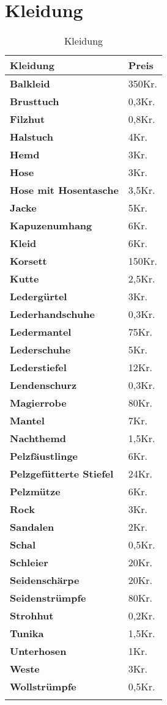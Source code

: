 \section{Kleidung}
\begin{longtable}{|p{5cm}|p{2cm}|}
\hline
\textbf{Kleidung} & \textbf{Preis} \\ \hline
\textbf{Balkleid} & 350Kr. \\ \hline
\textbf{Brusttuch} & 0,3Kr. \\ \hline
\textbf{Filzhut} & 0,8Kr. \\ \hline
\textbf{Halstuch} & 4Kr. \\ \hline
\textbf{Hemd} & 3Kr. \\ \hline
\textbf{Hose} & 3Kr. \\ \hline
\textbf{Hose mit Hosentasche} & 3,5Kr. \\ \hline
\textbf{Jacke} & 5Kr. \\ \hline
\textbf{Kapuzenumhang} & 6Kr. \\ \hline
\textbf{Kleid} & 6Kr. \\ \hline
\textbf{Korsett} & 150Kr. \\ \hline
\textbf{Kutte} & 2,5Kr. \\ \hline
\textbf{Ledergürtel} & 3Kr. \\ \hline
\textbf{Lederhandschuhe} & 0,3Kr. \\ \hline
\textbf{Ledermantel} & 75Kr. \\ \hline
\textbf{Lederschuhe} & 5Kr. \\ \hline
\textbf{Lederstiefel} & 12Kr. \\ \hline
\textbf{Lendenschurz} & 0,3Kr. \\ \hline
\textbf{Magierrobe} & 80Kr. \\ \hline
\textbf{Mantel} & 7Kr. \\ \hline
\textbf{Nachthemd} & 1,5Kr. \\ \hline
\textbf{Pelzfäustlinge} & 6Kr. \\ \hline
\textbf{Pelzgefütterte Stiefel} & 24Kr. \\ \hline
\textbf{Pelzmütze} & 6Kr. \\ \hline
\textbf{Rock} & 3Kr. \\ \hline
\textbf{Sandalen} & 2Kr. \\ \hline
\textbf{Schal} & 0,5Kr. \\ \hline
\textbf{Schleier} & 20Kr. \\ \hline
\textbf{Seidenschärpe} & 20Kr. \\ \hline
\textbf{Seidenstrümpfe} & 80Kr. \\ \hline
\textbf{Strohhut} & 0,2Kr. \\ \hline
\textbf{Tunika} & 1,5Kr. \\ \hline
\textbf{Unterhosen} & 1Kr. \\ \hline
\textbf{Weste} & 3Kr. \\ \hline
\textbf{Wollstrümpfe} & 0,5Kr. \\ \hline

\caption{Kleidung}
\label{tab:Kleidung}
\end{longtable}


